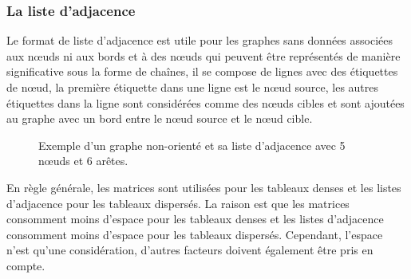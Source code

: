 \subsubsection{La liste d’adjacence}
Le format de liste d'adjacence est utile pour les graphes sans données associées aux nœuds ni aux bords et à des nœuds
qui peuvent être représentés de manière significative sous la forme de chaînes, il se compose de 
lignes avec des étiquettes de nœud, la première étiquette dans une ligne est le nœud source, les autres étiquettes dans la
ligne sont considérées comme des nœuds cibles et sont ajoutées au graphe avec un bord entre le nœud source et le nœud 
cible.\\
\begin{figure}[h]
	\centering
	\caption{Exemple d'un graphe non-orienté et sa liste d'adjacence avec 5 nœuds et 6 arêtes.}
	\label{matrice d'adjacence1}
\end{figure}

En règle générale, les matrices sont utilisées pour les tableaux denses et les listes d'adjacence pour les 
tableaux dispersés. La raison est que les matrices consomment moins d'espace pour les tableaux denses et les listes
d'adjacence consomment moins d'espace pour les tableaux dispersés. Cependant, l'espace n'est qu'une considération, d'autres
facteurs doivent également être pris en compte.


